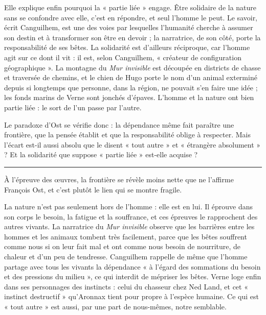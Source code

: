 \documentclass[11pt,a4paper]{article}
\begin{document}
Elle explique enfin pourquoi la « partie liée » engage. Être solidaire de la nature sans se confondre avec elle, c'est en répondre, et seul l'homme le peut. Le savoir, écrit Canguilhem, est une des voies par lesquelles l'humanité cherche à assumer son destin et à transformer son être en devoir ; la narratrice, de son côté, porte la responsabilité de ses bêtes. La solidarité est d'ailleurs réciproque, car l'homme agit sur ce dont il vit : il est, selon Canguilhem, « créateur de configuration géographique ». La montagne du \emph{Mur invisible} est découpée en districts de chasse et traversée de chemins, et le chien de Hugo porte le nom d'un animal exterminé depuis si longtemps que personne, dans la région, ne pouvait s'en faire une idée ; les fonds marins de Verne sont jonchés d'épaves. L'homme et la nature ont bien partie liée : le sort de l'un passe par l'autre.

Le paradoxe d'Ost se vérifie donc : la dépendance même fait paraître une frontière, que la pensée établit et que la responsabilité oblige à respecter. Mais l'écart est-il aussi absolu que le disent « tout autre » et « étrangère absolument » ? Et la solidarité que suppose « partie liée » est-elle acquise ?

\begin{center}\rule{0.5\linewidth}{0.5pt}\end{center}

À l'épreuve des œuvres, la frontière se révèle moins nette que ne l'affirme François Ost, et c'est plutôt le lien qui se montre fragile.

La nature n'est pas seulement hors de l'homme : elle est en lui. Il éprouve dans son corps le besoin, la fatigue et la souffrance, et ces épreuves le rapprochent des autres vivants. La narratrice du \emph{Mur invisible} observe que les barrières entre les hommes et les animaux tombent très facilement, parce que les bêtes souffrent comme nous si on leur fait mal et ont comme nous besoin de nourriture, de chaleur et d'un peu de tendresse. Canguilhem rappelle de même que l'homme partage avec tous les vivants la dépendance « à l'égard des sommations du besoin et des pressions du milieu », ce qui interdit de mépriser les bêtes. Verne loge enfin dans ses personnages des instincts : celui du chasseur chez Ned Land, et cet « instinct destructif » qu'Aronnax tient pour propre à l'espèce humaine. Ce qui est « tout autre » est aussi, par une part de nous-mêmes, notre semblable.
\end{document}
